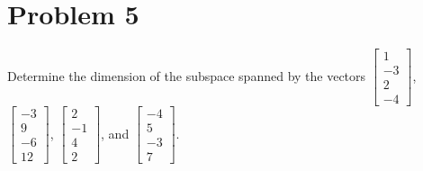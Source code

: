 \documentclass[letter,11pt]{article}
\theoremstyle{definition}
\begin{document}
\section{Problem 5}
Determine the dimension of the subspace spanned by the vectors $\begin{bmatrix} 1 \\ -3 \\ 2 \\ -4 \end{bmatrix}$, $\begin{bmatrix} -3 \\ 9 \\ -6 \\ 12 \end{bmatrix}$, $\begin{bmatrix} 2 \\ -1 \\ 4 \\ 2 \end{bmatrix}$, and $\begin{bmatrix} -4 \\ 5 \\ -3 \\ 7 \end{bmatrix}$.
\vspace{1cm}
\end{document}
